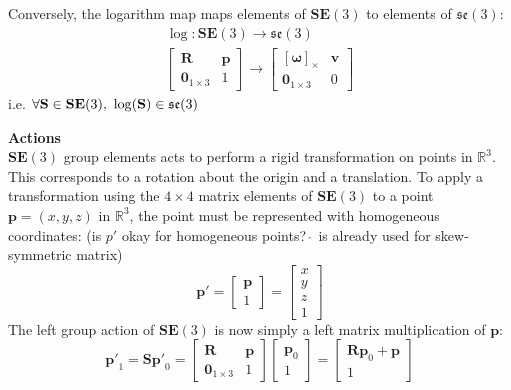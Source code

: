 			Conversely, the logarithm map maps elements of $\mathbf{SE}(3)$ to elements of $\mathfrak{se}(3)$:
			\begin{equation}
				\begin{split}
					\log: \mathbf{SE}(3) \rightarrow \mathfrak{se}(3)\\
					\begin{bmatrix}
						\mathbf{R}	&	\mathbf{p} \\
						\textbf{0}_{1 \times 3}		& 	1 					 				  
					\end{bmatrix}
					\rightarrow 
					\begin{bmatrix}
					 	[\mathbf{\omega}]_\times	&  \mathbf{v}\\
					 	\textbf{0}_{1 \times 3} & 0			
					\end{bmatrix}
				\end{split}		
			\end{equation}		
			i.e. $\forall \mathbf{S} \in \mathbf{SE}(3)  \textnormal{, } \log(\mathbf{S}) \in  \mathfrak{se}(3)$
		
		\textbf{Actions}\\
		$\mathbf{SE}(3)$ group elements acts to perform a rigid transformation on points in $\mathbb{R}^3$. This corresponds to a rotation about the origin and a translation.
		To apply a transformation using the $4 \times 4$ matrix elements of $\mathbf{SE}(3)$ to a point $\textbf{p} = (x,y,z) $ in $\mathbb{R}^3$, the point must be represented with homogeneous coordinates: (is $p'$ okay for homogeneous points? $\hat{\:}$ is already used for skew-symmetric matrix)
		\begin{equation}
			\mathbf{p'} = 
			\begin{bmatrix}
				  \mathbf{p} \\
				  1	
			\end{bmatrix} =
			\begin{bmatrix}
				  x	\\
				  y	\\
				  z	\\
				  1	
			\end{bmatrix}
		\end{equation}
		The left group action of $\mathbf{SE}(3)$ is now simply a left matrix multiplication of $\mathbf{p}$:
		\begin{equation}
			\mathbf{p'}_1 = \mathbf{S}\mathbf{p'}_0 = 
			\begin{bmatrix}
				\mathbf{R}	&	\mathbf{p} \\
				\textbf{0}_{1 \times 3}		& 	1 					 				  
			\end{bmatrix}
			\begin{bmatrix}
				\mathbf{p}_0 \\
				1	
			\end{bmatrix}
			=
			\begin{bmatrix}
				\mathbf{R}\mathbf{p}_0 + \mathbf{p}\\
				1	
			\end{bmatrix}
		\end{equation}
		
